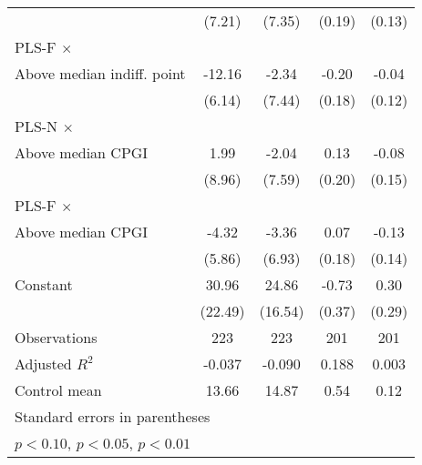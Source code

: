 \begin{table}[htbp]
\begin{tabular}{l*{4}{c}}
                &   (7.21)         &   (7.35)         &   (0.19)         &   (0.13)         \\
\addlinespace
PLS-F $\times$ \\ Above median indiff. point&   -12.16\sym{**} &    -2.34         &    -0.20         &    -0.04         \\
                &   (6.14)         &   (7.44)         &   (0.18)         &   (0.12)         \\
\addlinespace
PLS-N $\times$ \\ Above median CPGI&     1.99         &    -2.04         &     0.13         &    -0.08         \\
                &   (8.96)         &   (7.59)         &   (0.20)         &   (0.15)         \\
\addlinespace
PLS-F $\times$ \\ Above median CPGI&    -4.32         &    -3.36         &     0.07         &    -0.13         \\
                &   (5.86)         &   (6.93)         &   (0.18)         &   (0.14)         \\
\addlinespace
Constant        &    30.96         &    24.86         &    -0.73\sym{*}  &     0.30         \\
                &  (22.49)         &  (16.54)         &   (0.37)         &   (0.29)         \\
\midrule
Observations    &      223         &      223         &      201         &      201         \\
Adjusted \(R^{2}\)&   -0.037         &   -0.090         &    0.188         &    0.003         \\
Control mean    &    13.66         &    14.87         &     0.54         &     0.12         \\
\bottomrule
\multicolumn{5}{l}{\footnotesize Standard errors in parentheses}\\
\multicolumn{5}{l}{\footnotesize \sym{*} \(p<0.10\), \sym{**} \(p<0.05\), \sym{***} \(p<0.01\)}\\
\end{tabular}
\end{table}

